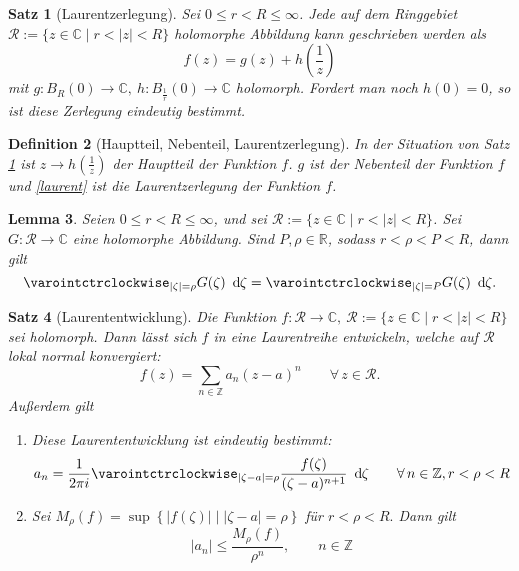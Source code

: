 \documentclass[a4paper,12pt]{book}
\theoremstyle{newthm}
\newtheorem{thm}{Satz}[section]
\newtheorem{lem}[thm]{Lemma}
\theoremstyle{newdef}
\newtheorem{defn}[thm]{Definition}
\theoremstyle{newrem}
\newcommand{\Z}{\mathbb{Z}}
\newcommand{\R}{\mathbb{R}}
\newcommand{\C}{\mathbb{C}}
\renewcommand{\d}{\ \operatorname{d}\hspace{-2px}}
\begin{document}
		\begin{thm}[Laurentzerlegung]\label{3.3.1}
			Sei $ 0 \leq r < R \leq \infty $. Jede auf dem Ringgebiet $ \mathcal{R} := \{z \in \C \mid r < |z| < R\} $ holomorphe Abbildung kann geschrieben werden als
			\begin{equation}\label{laurent}
			f(z) = g(z) + h\left(\frac{1}{z}\right)
			\end{equation}
			mit $ g: B_R(0) \to \C,\ h: B_{\frac{1}{r}}(0) \to \C $ holomorph. Fordert man noch $h(0) = 0$, so ist diese Zerlegung eindeutig bestimmt.
		\end{thm}
		
		\begin{defn}[Hauptteil, Nebenteil, Laurentzerlegung]
			In der Situation von Satz \ref{3.3.1} ist $ z \to h\left(\frac{1}{z}\right) $ der \emph{Hauptteil} der Funktion $f$. $g$ ist der \emph{Nebenteil} der Funktion $f$ und \ref{laurent} ist die \emph{Laurentzerlegung} der Funktion $f$.
		\end{defn}
		
		\begin{lem}
			Seien $ 0 \leq r < R \leq \infty $, und sei $ \mathcal{R} := \{z \in \C \mid r < |z| < R\} $. Sei $ G: \mathcal{R} \to \C $ eine holomorphe Abbildung. Sind $ P, \rho \in \R $, sodass $ r < \rho < P < R $, dann gilt 
			\[ \varointctrclockwise_{|\zeta| = \rho} G(\zeta) \d\zeta = \varointctrclockwise_{|\zeta| = P} G(\zeta)\d\zeta. \]
		\end{lem}
		
		\begin{thm}[Laurententwicklung]\label{3.3.4}
			Die Funktion $ f: \mathcal{R} \to \C,\ \mathcal{R} := \{z \in \C \mid r < |z| < R\} $ sei holomorph. Dann lässt sich $f$ in eine Laurentreihe entwickeln, welche auf $\mathcal{R}$ lokal normal konvergiert: 
			\[ f(z) = \sum_{n \in \Z} a_n (z-a)^n \qquad \forall\, z \in \mathcal{R}. \]
			Außerdem gilt
			\begin{enumerate}[label={\roman*})]
				\item Diese Laurententwicklung ist eindeutig bestimmt:
				\[ a_n = \frac{1}{2\pi i} \varointctrclockwise_{|\zeta - a| = \rho} \frac{f(\zeta)}{(\zeta - a)^{n+1}}\d\zeta \qquad \forall\, n \in \Z, r < \rho < R \]
				\item Sei $ M_\rho (f) = \sup \left\{|f(\zeta)| \mid |\zeta-a| = \rho \right\} $ für $ r < \rho < R. $ Dann gilt 
				\[ |a_n| \leq \frac{M_\rho(f)}{\rho^n}, \qquad n \in \Z \]
			\end{enumerate}
		\end{thm}
		
\end{document}
